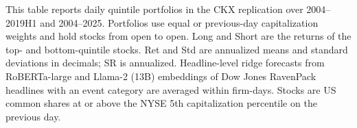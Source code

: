 \begin{table}[htbp]
\centering
\caption{CKX Replication: Portfolios Sorted on Return Forecasts}
\label{tab:tabR3_ckx_sorts}
\begin{minipage}{\linewidth}\footnotesize
This table reports daily quintile portfolios in the CKX replication over 2004--2019H1 and 2004--2025. Portfolios use equal or previous-day capitalization weights and hold stocks from open to open. Long and Short are the returns of the top- and bottom-quintile stocks. Ret and Std are annualized means and standard deviations in decimals; SR is annualized. Headline-level ridge forecasts from RoBERTa-large and Llama-2 (13B) embeddings of Dow Jones RavenPack headlines with an event category are averaged within firm-days. Stocks are US common shares at or above the NYSE 5th capitalization percentile on the previous day.
\end{minipage}
\medskip


\end{table}
